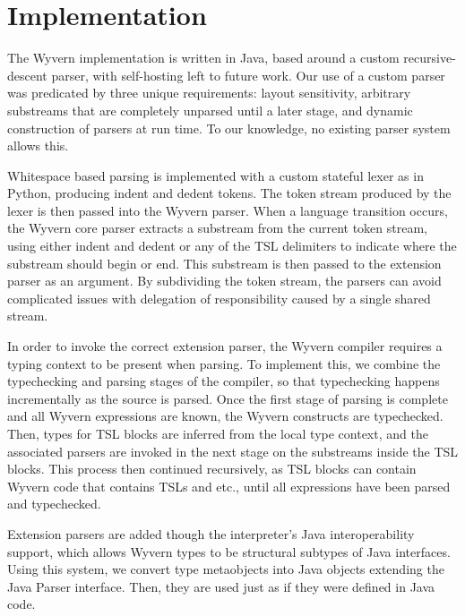 
\section{Implementation}
\label{s:implementation}
The Wyvern implementation is written in Java, based around a custom recursive-descent parser, with self-hosting left to future work. Our use of a custom parser was predicated by three unique requirements: layout sensitivity, arbitrary substreams that are completely unparsed until a later stage, and dynamic construction of parsers at run time. To our knowledge, no existing parser system allows this.

Whitespace based parsing is implemented with a custom stateful lexer as in Python, producing indent and dedent tokens. The token stream produced by the lexer is then passed into the Wyvern parser. When a language transition occurs, the Wyvern core parser extracts a substream from the current token stream, using either indent and dedent or any of the TSL delimiters to indicate where the substream should begin or end. This substream is then passed to the extension parser as an argument. By subdividing the token stream, the parsers can avoid complicated issues with delegation of responsibility caused by a single shared stream. 

In order to invoke the correct extension parser, the Wyvern compiler requires a typing context to be present when parsing. To implement this, we combine the typechecking and parsing stages of the compiler, so that typechecking happens incrementally as the source is parsed. Once the first stage of parsing is complete and all Wyvern expressions are known, the Wyvern constructs are typechecked. Then, types for TSL blocks are inferred from the local type context, and the associated parsers are invoked in the next stage on the substreams inside the TSL blocks. This process then continued recursively, as TSL blocks can contain Wyvern code that contains TSLs and etc., until all expressions have been parsed and typechecked.

Extension parsers are added though the interpreter's Java interoperability support, which allows Wyvern types to be structural subtypes of Java interfaces. Using this system, we convert type metaobjects into Java objects extending the Java Parser interface. Then, they are used just as if they were defined in Java code.
